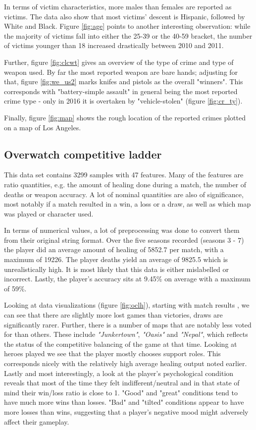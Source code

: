 \documentclass{article}
\begin{document}
In terms of victim characteristics, more males than females are reported as victims.
The data also show that most victims' descent is Hispanic, followed by White and Black.
Figure \ref{fig:age} points to another interesting observation: while the majority of victims fall into either the 25-39 or the 40-59 bracket, the number of victims younger than 18 increased drastically between 2010 and 2011.

Further, figure \ref{fig:clcwt} gives an overview of the type of crime and type of weapon used.
By far the most reported weapon are bare hands; adjusting for that, figure \ref{fig:we_us2} marks knifes and pistols as the overall "winners".
This corresponds with "battery-simple assault" in general being the most reported crime type - only in 2016 it is overtaken by "vehicle-stolen" (figure \ref{fig:cr_ty}).

Finally, figure \ref{fig:map} shows the rough location of the reported crimes plotted on a map of Los Angeles.

\subsection*{Overwatch competitive ladder}
This data set contains 3299 samples with 47 features.
Many of the features are ratio quantities, e.g. the amount of healing done during a match, the number of deaths or weapon accuracy.
A lot of nominal quantities are also of significance, most notably if a match resulted in a win, a loss or a draw, as well as which map was played or character used.

In terms of numerical values, a lot of preprocessing was done to convert them from their original string format.
Over the five seasons recorded (seasons 3 - 7) the player did an average amount of healing of 5852.7 per match, with a maximum of 19226.
The player deaths yield an average of 9825.5 which is unrealistically high.
It is most likely that this data is either mislabelled or incorrect.
Lastly, the player's accuracy sits at 9.45\% on average with a maximum of 59\%.

Looking at data visualizations (figure \ref{fig:oclh}), starting with match results , we can see that there are slightly more lost games than victories, draws are significantly rarer.
Further, there is a number of maps that are notably less voted for than others.
These include \textit{"Junkertown"}, \textit{"Oasis"} and \textit{"Nepal"}, which reflects the status of the competitive balancing of the game at that time.
Looking at heroes played we see that the player mostly chooses support roles.
This corresponds nicely with the relatively high average healing output noted earlier.
Lastly and most interestingly, a look at the player's psychological condition reveals that most of the time they felt indifferent/neutral and in that state of mind their win/loss ratio is close to 1.
"Good" and "great" conditions tend to have much more wins than losses.
"Bad" and "tilted" conditions appear to have more losses than wins, suggesting that a player's negative mood might adversely affect their gameplay.
\end{document}
